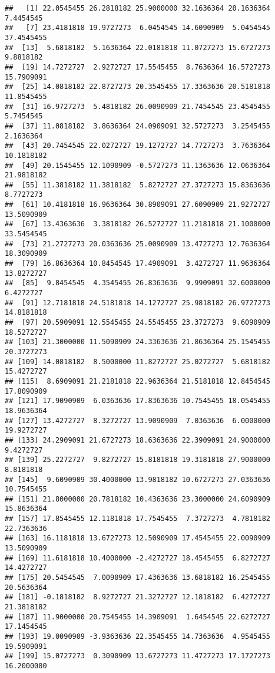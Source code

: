 \documentclass[]{book}
\begin{document}
\begin{verbatim}
##   [1] 22.0545455 26.2818182 25.9000000 32.1636364 20.1636364  7.4454545
##   [7] 23.4181818 19.9727273  6.0454545 14.6090909  5.0454545 37.4545455
##  [13]  5.6818182  5.1636364 22.0181818 11.0727273 15.6727273  9.8818182
##  [19] 14.7272727  2.9272727 17.5545455  8.7636364 16.5727273 15.7909091
##  [25] 14.0818182 22.8727273 20.3545455 17.3363636 20.5181818 11.8545455
##  [31] 16.9727273  5.4818182 26.0090909 21.7454545 23.4545455  5.7454545
##  [37] 11.0818182  3.8636364 24.0909091 32.5727273  3.2545455  2.1636364
##  [43] 20.7454545 22.0272727 19.1272727 14.7727273  3.7636364 10.1818182
##  [49] 20.1545455 12.1090909 -0.5727273 11.1363636 12.0636364 21.9818182
##  [55] 11.3818182 11.3818182  5.8272727 27.3727273 15.8363636  8.7727273
##  [61] 10.4181818 16.9636364 30.8909091 27.6090909 21.9272727 13.5090909
##  [67] 13.4363636  3.3818182 26.5272727 11.2181818 21.1000000 33.5454545
##  [73] 21.2727273 20.0363636 25.0090909 13.4727273 12.7636364 18.3090909
##  [79] 16.8636364 10.8454545 17.4909091  3.4272727 11.9636364 13.8272727
##  [85]  9.8454545  4.3545455 26.8363636  9.9909091 32.6000000  6.4272727
##  [91] 12.7181818 24.5181818 14.1272727 25.9818182 26.9727273 14.8181818
##  [97] 20.5909091 12.5545455 24.5545455 23.3727273  9.6090909 18.5272727
## [103] 21.3000000 11.5090909 24.3363636 21.8636364 25.1545455 20.3727273
## [109] 14.0818182  8.5000000 11.8272727 25.0272727  5.6818182 15.4272727
## [115]  8.6909091 21.2181818 22.9636364 21.5181818 12.8454545 17.8090909
## [121] 17.9090909  6.0363636 17.8363636 10.7545455 18.0545455 18.9636364
## [127] 13.4272727  8.3272727 13.9090909  7.0363636  6.0000000 19.9272727
## [133] 24.2909091 21.6727273 18.6363636 22.3909091 24.9000000  9.4272727
## [139] 25.2272727  9.8272727 15.8181818 19.3181818 27.9000000  8.8181818
## [145]  9.6090909 30.4000000 13.9818182 10.6727273 27.0363636 10.7545455
## [151] 21.8000000 20.7818182 10.4363636 23.3000000 24.6090909 15.8636364
## [157] 17.8545455 12.1181818 17.7545455  7.3727273  4.7818182 22.7363636
## [163] 16.1181818 13.6727273 12.5090909 17.4545455 22.0090909 13.5090909
## [169] 11.6181818 10.4000000 -2.4272727 18.4545455  6.8272727 14.4272727
## [175] 20.5454545  7.0090909 17.4363636 13.6818182 16.2545455 20.5636364
## [181] -0.1818182  8.9272727 21.3272727 12.1818182  6.4272727 21.3818182
## [187] 11.9000000 20.7545455 14.3909091  1.6454545 22.6272727 17.1454545
## [193] 19.0090909 -3.9363636 22.3545455 14.7363636  4.9545455 19.5909091
## [199] 15.0727273  0.3090909 13.6727273 11.4727273 17.1727273 16.2000000

\end{verbatim}
\end{document}
